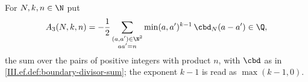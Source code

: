 For $N,k,n\in\N$ put
\[
  A_3(N,k,n)=-\frac12\sum_{\substack{(a,a')\in\N^2\\ aa'=n}}\min(a,a')^{k-1}\,\cbd_N(a-a')\in\Q,
\]
the sum over the pairs of positive integers with product $n$, with $\cbd$ as in \cref{III.ef.def:boundary-divisor-sum}; the exponent $k-1$ is
read as $\max(k-1,0)$.
